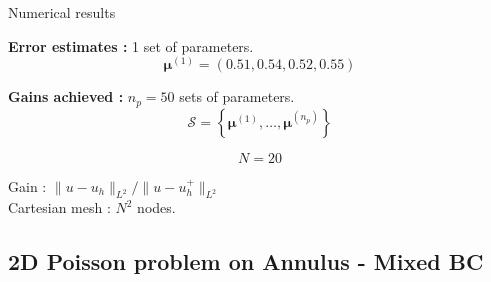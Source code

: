 \begin{frame}[noframenumbering]{Numerical results}
	\hspace{-5pt}\begin{minipage}[t]{0.46\linewidth}
		\textbf{Error estimates :} 1 set of parameters.
		$$\bm{\mu}^{(1)}=(0.51,0.54,0.52,0.55)$$
		\vspace{-35pt}
		\begin{figure}[H]
		\end{figure}
	\end{minipage} \qquad \small
	\begin{minipage}[t]{0.48\linewidth}
		\textbf{Gains achieved :} $n_p=50$ sets of parameters.
		$$\mathcal{S}=\left\{\bm{\mu}^{(1)},\dots,\bm{\mu}^{(n_p)}\right\}$$
		\vspace{-15pt}
		\begin{table}[H]
		\end{table}

		\normalsize\centering\vspace{-20pt}
		$$N=20$$

		\vspace{-5pt}
		Gain : $\| u-u_h\|_{L^2} / \| u-u_h^+\|_{L^2}$ \\
		
		\small\vspace{8pt}
		Cartesian mesh : $N^2$ nodes.
	\end{minipage}
\end{frame}

\subsection{2D Poisson problem on Annulus - Mixed BC}

